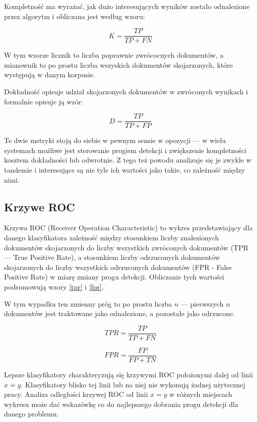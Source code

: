\documentclass[11pt,a4paper]{article}
\begin{document}
Kompletność ma wyrażać, jak dużo interesujących wyników zostało odnalezione przez
algorytm i obliczana jest według wzoru:

\begin{equation}
  K = \frac{TP}{TP + FN}
\end{equation}

W tym wzorze licznik to liczba poprawnie zwrócocnych dokumentów, a mianownik
to po prostu liczba wszyskich dokumentów skojarzonych, które występują w danym
korpusie.

Dokładność opisuje udział skojarzonych dokumentów w zwróconych wynikach i formalnie
opisuje ją wzór:

\begin{equation}
  D = \frac{TP}{TP + FP}
\end{equation}

Te dwie metryki stoją do siebie w pewnym sensie w opozycji --- w wielu
systemach możliwe jest sterowanie progiem detekcji i zwiększenie kompletności
kosztem dokładności lub odwrotnie. Z tego też powodu analizuje się je zwykle w
tandemie i interesujące są nie tyle ich wartości jako takie, co zależność
między nimi.

\subsection{Krzywe ROC}

Krzywa ROC \cite{roc-article1} (Receiver Operation Characteristic) to wykres
przedstawiający dla danego klasyfikatora zależność między stosunkiem liczby
znalezionych dokumentów skojarzonych do liczby wszystkich zwróconych dokumentów
(TPR --- True Positive Rate), a stosunkiem liczby odrzuconych dokumentów
skojarzonych do liczby wszystkich odrzuconych dokumentów (FPR - False Positive
Rate) w miarę zmiany progu detekcji. Obliczanie tych wartości podsumowują
wzory \ref{tpr} i \ref{fpr}.

W tym wypadku ten zmienny próg to po prostu liczba $n$ --- pierwszych $n$
dokumentów jest traktowane jako odnalezione, a pozostałe jako odrzucone.

\begin{equation}
\label{tpr}
TPR = \frac{TP}{TP + FN}
\end{equation}

\begin{equation}
\label{fpr}
FPR = \frac{FP}{FP + TN}
\end{equation}

Lepsze klasyfikatory charakteryzują się krzywymi ROC położonymi dalej od linii
$x = y$.  Klasyfikatory blisko tej linii lub na niej nie wykonują żadnej użytecznej
pracy. Analiza odległości krzywej ROC od linii $x = y$ w różnych miejscach
wykresu może dać wskazówkę co do najlepszego dobrania progu detekcji dla danego
problemu.
\end{document}
